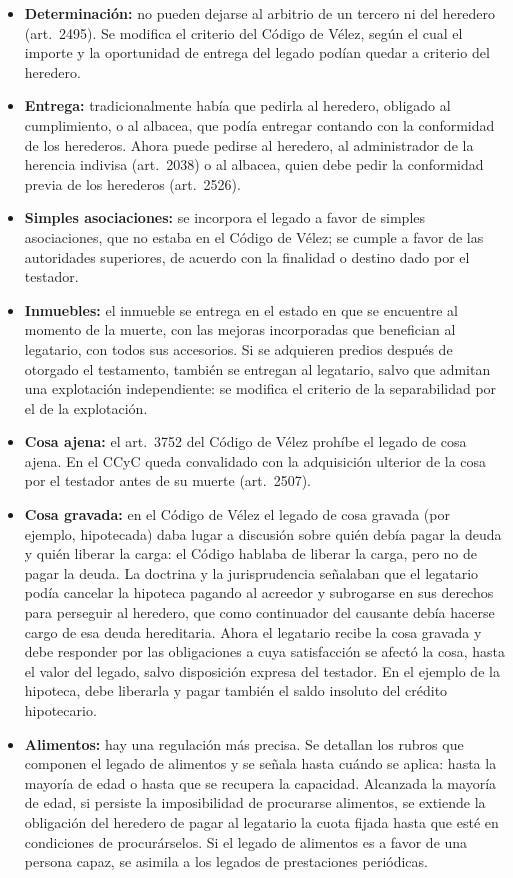 \documentclass[12pt,oneside]{book}
\begin{document}
\begin{itemize}
    \item \textbf{Determinación:} no pueden dejarse al arbitrio de un tercero ni del heredero (art.~2495). Se modifica el criterio del Código de Vélez, según el cual el importe y la oportunidad de entrega del legado podían quedar a criterio del heredero.
    \item \textbf{Entrega:} tradicionalmente había que pedirla al heredero, obligado al cumplimiento, o al albacea, que podía entregar contando con la conformidad de los herederos. Ahora puede pedirse al heredero, al administrador de la herencia indivisa (art.~2038) o al albacea, quien debe pedir la conformidad previa de los herederos (art.~2526).
    \item \textbf{Simples asociaciones:} se incorpora el legado a favor de simples asociaciones, que no estaba en el Código de Vélez; se cumple a favor de las autoridades superiores, de acuerdo con la finalidad o destino dado por el testador.
    \item \textbf{Inmuebles:} el inmueble se entrega en el estado en que se encuentre al momento de la muerte, con las mejoras incorporadas que benefician al legatario, con todos sus accesorios. Si se adquieren predios después de otorgado el testamento, también se entregan al legatario, salvo que admitan una explotación independiente: se modifica el criterio de la separabilidad por el de la explotación.
    \item \textbf{Cosa ajena:} el art.~3752 del Código de Vélez prohíbe el legado de cosa ajena. En el CCyC queda convalidado con la adquisición ulterior de la cosa por el testador antes de su muerte (art.~2507).
    \item \textbf{Cosa gravada:} en el Código de Vélez el legado de cosa gravada (por ejemplo, hipotecada) daba lugar a discusión sobre quién debía pagar la deuda y quién liberar la carga: el Código hablaba de liberar la carga, pero no de pagar la deuda. La doctrina y la jurisprudencia señalaban que el legatario podía cancelar la hipoteca pagando al acreedor y subrogarse en sus derechos para perseguir al heredero, que como continuador del causante debía hacerse cargo de esa deuda hereditaria. Ahora el legatario recibe la cosa gravada y debe responder por las obligaciones a cuya satisfacción se afectó la cosa, hasta el valor del legado, salvo disposición expresa del testador. En el ejemplo de la hipoteca, debe liberarla y pagar también el saldo insoluto del crédito hipotecario.
    \item \textbf{Alimentos:} hay una regulación más precisa. Se detallan los rubros que componen el legado de alimentos y se señala hasta cuándo se aplica: hasta la mayoría de edad o hasta que se recupera la capacidad. Alcanzada la mayoría de edad, si persiste la imposibilidad de procurarse alimentos, se extiende la obligación del heredero de pagar al legatario la cuota fijada hasta que esté en condiciones de procurárselos. Si el legado de alimentos es a favor de una persona capaz, se asimila a los legados de prestaciones periódicas.
\end{itemize}
\end{document}
